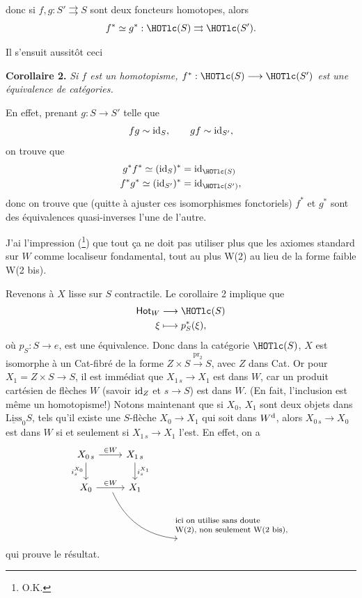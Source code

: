 donc si $f,g : S' \rightrightarrows S$ sont deux foncteurs homotopes, alors
\[ f^* \simeq g^* : \HOTlc(S) \rightrightarrows \HOTlc(S'). \]

Il s'ensuit aussitôt ceci

\textbf{Corollaire 2.} \textit{Si $f$ est un homotopisme, $f^* : \HOTlc(S) \longrightarrow \HOTlc(S')$ est une équivalence de catégories.}

En effet, prenant $g : S \longrightarrow S'$ telle que
\[ fg \sim \mathrm{id}_S, \qquad gf \sim \mathrm{id}_{S'}, \]
on trouve que
\[ \begin{aligned}
g^*f^* \simeq (\id_S)^* &= \id_{\HOTlc(S)} \\
f^*g^* \simeq (\id_{S'})^* &= \id_{\HOTlc(S')},
\end{aligned} \]
donc on trouve que (quitte à ajuster ces isomorphismes fonctoriels) $f^*$ et $g^*$ sont des équivalences quasi-inverses l'une de l'autre.

J'ai l'impression (\footnote[54]{O.K.}) que tout ça ne doit pas utiliser plus que les axiomes standard sur $W$ comme localiseur fondamental, tout au plus W(2) au lieu de la forme faible W(2 bis).

Revenons à $X$ lisse sur $S$ contractile. Le corollaire 2 implique que
\[ \begin{aligned}
\Hot_W &\longrightarrow \HOTlc(S) \\
\xi &\longmapsto p^*_S(\xi),
\end{aligned} \]
où $p_S : S \longrightarrow e$, est une équivalence. Donc dans la catégorie $\HOTlc(S)$, $X$ est isomorphe  à un Cat-fibré de la forme $Z \times S \xrightarrow{\mathrm{pr}_2} S$, avec $Z$ dans Cat. Or pour $X_1 = Z \times S \longrightarrow S$, il est immédiat que $X_{1\,s} \longrightarrow X_1$ est dans $W$, car un produit cartésien de flèches $W$ (savoir $\mathrm{id}_Z$ et $s \longrightarrow S$) est dans $W$. (En fait, l'inclusion est même un homotopisme!) Notons maintenant que si $X_0$, $X_1$ sont deux objets dans $\underline{\mathrm{Liss}}_0S$, tels qu'il existe une $S$-flèche $X_0 \longrightarrow X_1$ qui soit dans $W^{\mathrm{d}}$, alors $X_{0\,s} \longrightarrow X_0$ est dans $W$ si et seulement si $X_{1\,s} \longrightarrow X_1$ l'est. En effet, on a
\[ \begin{tikzcd}
X_{0\,s} \arrow[r, "\in W"] \arrow[d, "i_s^{X_0}"'] & X_{1\,s} \arrow[d, "i_s^{X_1}"] & \\
X_0 \arrow[r, "\in W", ""{name=A, below}] & X_1 & \\
 & & \text{\footnotesize\begin{tabular}{@{}l@{}}ici on utilise sans doute\\ W(2), non seulement W(2 bis),\end{tabular}}
\arrow[from=A, to=3-3, bend right]
\end{tikzcd} \]
qui prouve le résultat.

